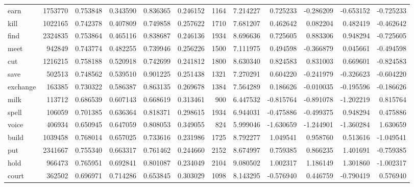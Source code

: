 \begin{tabular}{lrrrrrrrrrrr}
earn      &   1753770 &  0.753848 &      0.343590 &    0.836365 &  0.246152 &  1164 &  7.214227 &  0.725233 & -0.286209 & -0.653152 &     -0.725233 \\
kill      &   1022165 &  0.742378 &      0.407809 &    0.749858 &  0.257622 &  1710 &  7.681207 &  0.462642 &  0.082204 &  0.482419 &     -0.462642 \\
find      &   2324835 &  0.753864 &      0.465116 &    0.838687 &  0.246136 &  1934 &  8.696636 &  0.725605 &  0.883306 &  0.948294 &     -0.725605 \\
meet      &    942849 &  0.743774 &      0.482255 &    0.739946 &  0.256226 &  1500 &  7.111975 &  0.494598 & -0.366879 &  0.045661 &     -0.494598 \\
cut       &   1216215 &  0.758188 &      0.520918 &    0.742699 &  0.241812 &  1800 &  8.630340 &  0.824583 &  0.831003 &  0.669601 &     -0.824583 \\
save      &    502513 &  0.748562 &      0.539510 &    0.901225 &  0.251438 &  1321 &  7.270291 &  0.604220 & -0.241979 & -0.326623 &     -0.604220 \\
exchange  &    163385 &  0.730322 &      0.586387 &    0.863135 &  0.269678 &  1384 &  7.564289 &  0.186626 & -0.010035 & -0.195596 &     -0.186626 \\
milk      &    113712 &  0.686539 &      0.607143 &    0.668619 &  0.313461 &   900 &  6.447532 & -0.815764 & -0.891078 & -1.202219 &      0.815764 \\
spell     &    106059 &  0.701385 &      0.636364 &    0.818371 &  0.298615 &  1934 &  6.944031 & -0.475886 & -0.499375 &  0.948294 &      0.475886 \\
voice     &    406934 &  0.650945 &      0.647059 &    0.808053 &  0.349055 &   824 &  5.999046 & -1.630659 & -1.244901 & -1.360284 &      1.630659 \\
build     &   1039458 &  0.768014 &      0.657025 &    0.733616 &  0.231986 &  1725 &  8.792277 &  1.049541 &  0.958760 &  0.513616 &     -1.049541 \\
put       &   2341667 &  0.755340 &      0.663317 &    0.761462 &  0.244660 &  2152 &  8.674997 &  0.759385 &  0.866235 &  1.401691 &     -0.759385 \\
hold      &    966473 &  0.765951 &      0.692841 &    0.801087 &  0.234049 &  2104 &  9.080502 &  1.002317 &  1.186149 &  1.301860 &     -1.002317 \\
court     &    362502 &  0.696971 &      0.714286 &    0.653845 &  0.303029 &  1098 &  8.143295 & -0.576940 &  0.446759 & -0.790419 &      0.576940 \\

\end{tabular}
